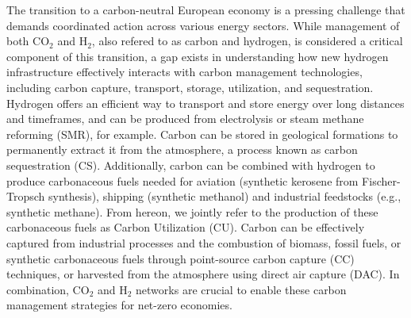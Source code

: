 \documentclass[twocolumn]{article}
\newcommand{\COtwo}{CO$_2$}
\newcommand{\Htwo}{H$_2$}
\begin{document}
The transition to a carbon-neutral European economy is a pressing challenge that demands coordinated action across various energy sectors. While management of both \COtwo{} and \Htwo{}, also refered to as carbon and hydrogen, is considered a critical component of this transition, a gap exists in understanding how new hydrogen infrastructure effectively interacts with carbon management technologies, including carbon capture, transport, storage, utilization, and sequestration. Hydrogen offers an efficient way to transport and store energy over long distances and timeframes, and can be produced from electrolysis or steam methane reforming (SMR), for example. Carbon can be stored in geological formations to permanently extract it from the atmosphere, a process known as carbon sequestration (CS). Additionally, carbon can be combined with hydrogen to produce carbonaceous fuels needed for aviation (synthetic kerosene from Fischer-Tropsch synthesis), shipping (synthetic methanol) and industrial feedstocks (e.g., synthetic methane). From hereon, we jointly refer to the production of these carbonaceous fuels as Carbon Utilization (CU). Carbon can be effectively captured from industrial processes and the combustion of biomass, fossil fuels, or synthetic carbonaceous fuels through point-source carbon capture (CC) techniques, or harvested from the atmosphere using direct air capture (DAC). In combination, \COtwo{} and \Htwo{} networks are crucial to enable these carbon management strategies for net-zero economies.

\end{document}
